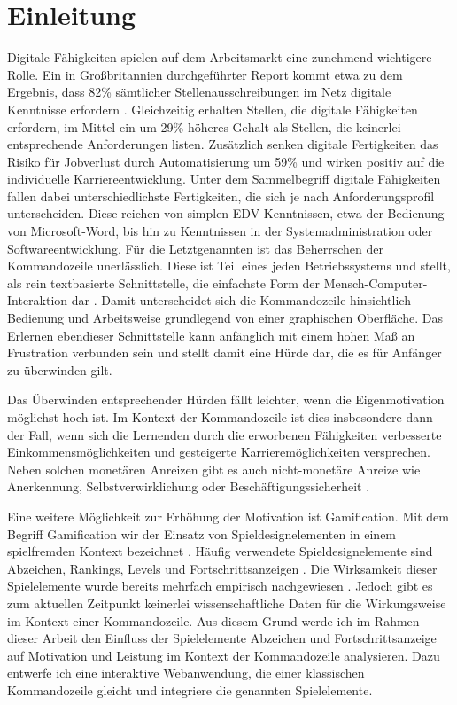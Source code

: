 \section{Einleitung}
Digitale Fähigkeiten spielen auf dem Arbeitsmarkt eine zunehmend wichtigere Rolle. Ein in Großbritannien durchgeführter Report kommt etwa zu dem Ergebnis, dass 82\% sämtlicher Stellenausschreibungen im Netz digitale Kenntnisse erfordern \cite{no_longer_optional}. Gleichzeitig erhalten Stellen, die digitale Fähigkeiten erfordern, im Mittel ein um 29\% höheres Gehalt als Stellen, die keinerlei entsprechende Anforderungen listen. Zusätzlich senken digitale Fertigkeiten das Risiko für Jobverlust durch Automatisierung um 59\% und wirken positiv auf die individuelle Karriereentwicklung. Unter dem Sammelbegriff digitale Fähigkeiten fallen dabei unterschiedlichste Fertigkeiten, die sich je nach Anforderungsprofil unterscheiden. Diese reichen von simplen EDV-Kenntnissen, etwa der Bedienung von Microsoft-Word, bis hin zu Kenntnissen in der Systemadministration oder Softwareentwicklung. Für die Letztgenannten ist das Beherrschen der Kommandozeile unerlässlich. Diese ist Teil eines jeden Betriebssystems und stellt, als rein textbasierte Schnittstelle, die einfachste Form der Mensch-Computer-Interaktion dar \cite{Kumar2005}. Damit unterscheidet sich die Kommandozeile hinsichtlich Bedienung und Arbeitsweise grundlegend von einer graphischen Oberfläche. Das Erlernen ebendieser Schnittstelle kann anfänglich mit einem hohen Maß an Frustration verbunden sein und stellt damit eine Hürde dar, die es für Anfänger zu überwinden gilt.

Das Überwinden entsprechender Hürden fällt leichter, wenn die Eigenmotivation möglichst hoch ist. Im Kontext der Kommandozeile ist dies insbesondere dann der Fall, wenn sich die Lernenden durch die erworbenen Fähigkeiten verbesserte Einkommensmöglichkeiten und gesteigerte Karrieremöglichkeiten versprechen. Neben solchen monetären Anreizen gibt es auch nicht-monetäre Anreize wie Anerkennung, Selbstverwirklichung oder Beschäftigungssicherheit \cite{shujaat}. 

Eine weitere Möglichkeit zur Erhöhung der Motivation ist Gamification. Mit dem Begriff Gamification wir der Einsatz von Spieldesignelementen in einem spielfremden Kontext bezeichnet \cite{deterding_game_2011}. Häufig verwendete Spieldesignelemente sind Abzeichen, Rankings, Levels und Fortschrittsanzeigen \cite{koch2013gamification}. Die Wirksamkeit dieser Spielelemente wurde bereits mehrfach empirisch nachgewiesen \cite{koivisto_rise_2019}. Jedoch gibt es zum aktuellen Zeitpunkt keinerlei wissenschaftliche Daten für die Wirkungsweise im Kontext einer Kommandozeile. Aus diesem Grund werde ich im Rahmen dieser Arbeit den Einfluss der Spielelemente Abzeichen und Fortschrittsanzeige auf Motivation und Leistung im Kontext der Kommandozeile analysieren. Dazu entwerfe ich eine interaktive Webanwendung, die einer klassischen Kommandozeile gleicht und integriere die genannten Spielelemente. 